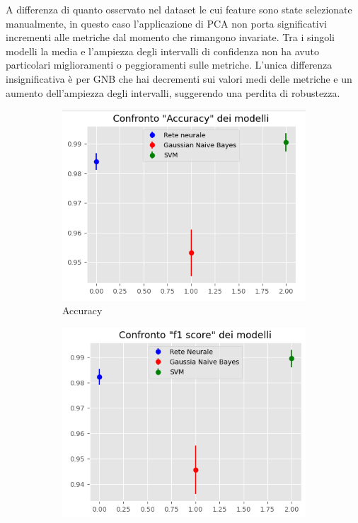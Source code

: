 A differenza di quanto osservato nel dataset le cui feature sono state selezionate
manualmente, in questo caso l'applicazione di PCA non porta significativi incrementi
alle metriche dal momento che rimangono invariate. Tra i singoli modelli la media 
e l'ampiezza degli intervalli di confidenza non ha avuto particolari miglioramenti 
o peggioramenti sulle metriche. L'unica differenza insignificativa è per GNB che 
hai decrementi sui valori medi delle metriche e un aumento dell'ampiezza degli
intervalli, suggerendo una perdita di robustezza.
\begin{figure}[!ht]
    \centering
    \begin{subfigure}[b]{0.4\textwidth}
        \centering
        \includegraphics[width=\textwidth]{img/ris/accuracy_inter_pca.png}
        \caption{Accuracy}
        \label{fig:acc_pca}
    \end{subfigure}
    \hfill
    \begin{subfigure}[b]{0.4\textwidth}
        \centering
        \includegraphics[width=\textwidth]{img/ris/fscore_inter_pca.png}

\end{subfigure}
\end{figure}
